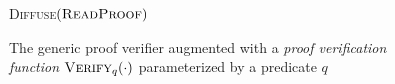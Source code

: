 \begin{figure}[t]
\begin{algorithm}[H]
    \caption{\label{alg.generic-verifier} The generic proof verifier augmented
        with a{ \em proof verification function} $\textsc{Verify}_q(\cdot)$
        parameterized by a predicate $q$}
    \begin{algorithmic}[1]
        \Statex
            \If{$\Pi \neq \emptyset$}
            \EndIf
                \State\textsc{Diffuse}{$(\textsc{ReadProof})$}
            \EndIf
        \EndWhile
        \vskip8pt
    \end{algorithmic}
\end{algorithm}
\end{figure}

